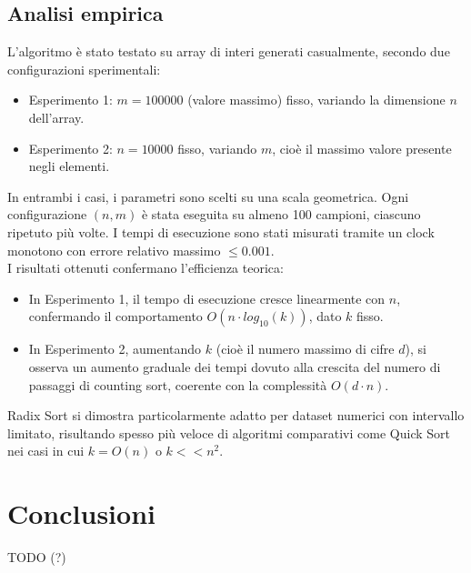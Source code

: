 \documentclass[a4paper, 12pt, oneside]{book}
\begin{document}
\section{Analisi empirica}
L'algoritmo è stato testato su array di interi generati casualmente, secondo due configurazioni sperimentali:

\begin{itemize}
    \item Esperimento 1: \(m = 100000\) (valore massimo) fisso, variando la dimensione \(n\) dell'array.
    \item Esperimento 2: \(n = 10000\) fisso, variando \(m\), cioè il massimo valore presente negli elementi.
\end{itemize}

\noindent In entrambi i casi, i parametri sono scelti su una scala geometrica. Ogni configurazione \((n, m)\) è stata eseguita su almeno 100 campioni, ciascuno ripetuto più volte. I tempi di esecuzione sono stati misurati tramite un clock monotono con errore relativo massimo \(\leq 0.001\). \\

\noindent I risultati ottenuti confermano l'efficienza teorica:

\begin{itemize}
    \item In Esperimento 1, il tempo di esecuzione cresce linearmente con \(n\), confermando il comportamento \(O(n \cdot log_{10}(k))\), dato \(k\) fisso.
    \item In Esperimento 2, aumentando \(k\) (cioè il numero massimo di cifre \(d\)), si osserva un aumento graduale dei tempi dovuto alla crescita del numero di passaggi di counting sort, coerente con la complessità \(O(d \cdot n)\).
\end{itemize}

\noindent Radix Sort si dimostra particolarmente adatto per dataset numerici con intervallo limitato, risultando spesso più veloce di algoritmi comparativi come Quick Sort nei casi in cui \(k = O(n)\) o \(k << n^2\).


\chapter{Conclusioni}\label{chap:Conclusioni} %

TODO (?)

\end{document}
